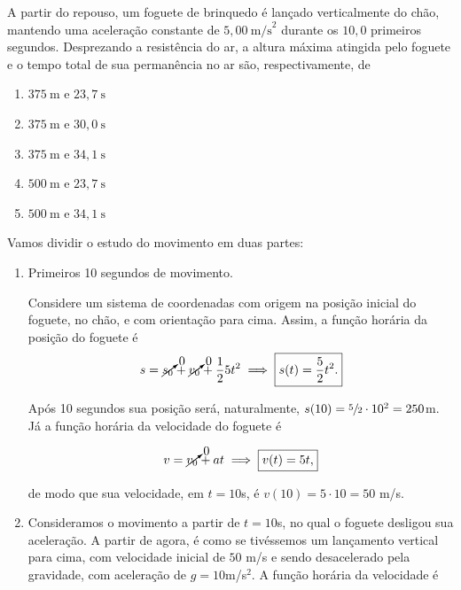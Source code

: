\begin{exemplo}\label{exemplo_cinematicaescalar_funcaoposicaomuvex02}


A partir do repouso, um foguete de brinquedo é lançado verticalmente do chão,
mantendo uma aceleração constante de $5{,}00\ \text{m/s}^2$ durante os
$10{,}0$ primeiros segundos. Desprezando a resistência do ar, a altura máxima
atingida pelo foguete e o tempo total de sua permanência no ar são,
respectivamente, de

\begin{enumerate}
  \item [(a)] $375\ \text{m}$ e $23{,}7\ \text{s}$
  \item [(b)] $375\ \text{m}$ e $30{,}0\ \text{s}$
  \item [(c)] $375\ \text{m}$ e $34{,}1\ \text{s}$
  \item [(d)] $500\ \text{m}$ e $23{,}7\ \text{s}$
  \item [(e)] $500\ \text{m}$ e $34{,}1\ \text{s}$
\end{enumerate}

\resolucao



Vamos dividir o estudo do movimento em duas partes:

\begin{enumerate}
    \item [(i)] Primeiros 10 segundos de movimento.

  Considere um sistema de coordenadas com origem na posição inicial do foguete, no chão, e com orientação para cima. Assim, a função horária da posição do foguete é
  $$ s= \cancelto{0}{s_0}+\cancelto{0}{v_0}+\dfrac{1}{2}5t^2 \implies \boxed{s(t)=\dfrac{5}{2}t^2.}$$

  Após 10 segundos sua posição será, naturalmente, $s(10)= \sfrac{5}{2}\cdot 10^2 = 250$m. Já a função horária da velocidade do foguete é

  $$ v= \cancelto{0}{v_0}+at \implies \boxed{v(t)=5t,}$$

  \noindent de modo que sua velocidade, em $t=10$s, é $v(10)=5\cdot 10=50$ m/s.

  \item[(ii)] Consideramos o movimento a partir de $t=10$s, no qual o foguete desligou sua aceleração. A partir de agora, é como se tivéssemos um lançamento vertical para cima, com velocidade inicial de $50$ m/s e sendo desacelerado pela gravidade, com aceleração de $g=10$m/s$^2.$ A função horária da velocidade é


\end{enumerate}
\end{exemplo}
